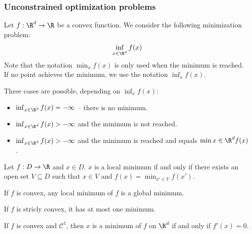 \documentclass[toc, titlepaged]{../cs-classes/cs-classes}
\begin{document}
\subsubsection{Unconstrained optimization problems}
Let $f:\R^d\to\R$ be a convex function. We consider the following minimization problem:
\begin{equation*}
    \inf_{x\in\R^d}f(x)
\end{equation*}
Note that the notation $\min_x f(x)$ is only used when the minimum is reached. If no point achieves the minimum, we use the notation $\inf_xf(x)$.

Three cases are possible, depending on $\inf_xf(x)$:
\begin{itemize}
    \item $\inf_{x\in\R^d}f(x)=-\infty$ -- there is no minimum.
    \item $\inf_{x\in\R^d}f(x)>-\infty$ and the minimum is not reached.
    \item $\inf_{x\in\R^d}f(x)>-\infty$ and the minimum is reached and equals $\min{x\in\R^d}f(x)$.
\end{itemize}

\begin{definition}
    Let $f:D\to\R$ and $x\in D$. $x$ is a local minimum if and only if there exists an open set $V\subseteq D$ such that $x\in V$ and $f(x)=\min_{x'\in V}f(x')$.
\end{definition}

\begin{property}
    \label{prop:local-global-min}
    If $f$ is convex, any local minimum of $f$ is a global minimum.
\end{property}

\begin{property}
    If $f$ is stricly convex, it has at most one minimum.
\end{property}

\begin{property}
    If $f$ is convex and $\mathcal{C}^1$, then $x$ is a minimum of $f$ on $\R^d$ if and only if $f'(x)=0$.
\end{property}
\end{document}
